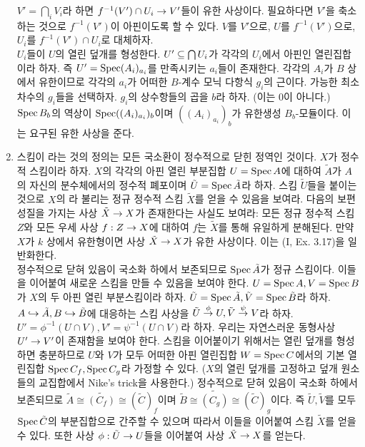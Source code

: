 \begin{enumerate}[label=\tb{3.\arabic*.},itemindent=0mm,itemsep=4mm]
	$V'=\bigcap_iV_i$라 하면 $f^{-1}(V')\cap U_i\rightarrow V'$들이 유한 사상이다.
	필요하다면 $V'$을 축소하는 것으로 $f^{-1}(V')$이 아핀이도록 할 수 있다.
	$V$를 $V'$으로, $U$를 $f^{-1}(V')$으로, $U_i$를 $f^{-1}(V')\cap U_i$로 대체하자.\\
	$U_i$들이 $U$의 열린 덮개를 형성한다. $U'\subseteq\bigcap U_i$가 각각의 $U_i$에서 아핀인 열린집합이라 하자.
	즉 $U'=\operatorname{Spec}(A_i)_{a_i}$를 만족시키는 $a_i$들이 존재한다.
	각각의 $A_i$가 $B$ 상에서 유한이므로 각각의 $a_i$가 어떠한 $B$-계수 모닉 다항식 $g_i$의 근이다.
	가능한 최소 차수의 $g_i$들을 선택하자. $g_i$의 상수항들의 곱을 $b$라 하자. (이는 0이 아니다.)
	$\operatorname{Spec} B_b$의 역상이 $\operatorname{Spec}((A_i)_{a_i})_b$이며 $((A_i)_{a_i})_b$가 유한생성 $B_b$-모듈이다. 이는 요구된 유한 사상을 준다.
	\item {} 스킴이 라는 것의 정의는 모든 국소환이 정수적으로 닫힌 정역인 것이다.
	$X$가 정수적 스킴이라 하자. $X$의 각각의 아핀 열린 부분집합 $U=\operatorname{Spec} A$에 대하여
	$\tilde A$가 $A$의 자신의 분수체에서의 정수적 폐포이며 $\tilde U=\operatorname{Spec}\tilde A$라 하자.
	스킴 $\tilde U$들을 붙이는 것으로 $X$의 라 불리는 정규 정수적 스킴 $\tilde X$를 얻을 수 있음을 보여라.
	다음의 보편 성질을 가지는 사상 $\tilde X\rightarrow X$가 존재한다는 사실도 보여라:
	모든 정규 정수적 스킴 $Z$와 모든 우세 사상 $f:Z\rightarrow X$에 대하여 $f$는 $\tilde X$를 통해 유일하게 분해된다.
	만약 $X$가 $k$ 상에서 유한형이면 사상 $\tilde X\rightarrow X$가 유한 사상이다. 이는 (I, Ex. 3.17)을 일반화한다.\\
	\sol 정수적으로 닫혀 있음이 국소화 하에서 보존되므로 $\operatorname{Spec}\tilde A$가 정규 스킴이다.
	이들을 이어붙여 새로운 스킴을 만들 수 있음을 보여야 한다.
	$U=\operatorname{Spec} A,V=\operatorname{Spec} B$가 $X$의 두 아핀 열린 부분스킴이라 하자.
	$\tilde U=\operatorname{Spec}\tilde A,\tilde V=\operatorname{Spec}\tilde B$라 하자.
	$A\hookrightarrow\tilde A,B\hookrightarrow\tilde B$에 대응하는 스킴 사상을 $\tilde U\stackrel{\phi}{\rightarrow} U,\tilde V\stackrel{\psi}{\rightarrow} V$라 하자.
	$U'=\phi^{-1}(U\cap V),V'=\psi^{-1}(U\cap V)$라 하자. 우리는 자연스러운 동형사상 $U'\rightarrow V'$이 존재함을 보여야 한다.
	스킴을 이어붙이기 위해서는 열린 덮개를 형성하면 충분하므로 $U$와 $V$가 모두 어떠한 아핀 열린집합 $W=\operatorname{Spec} C$에서의 기본 열린집합
	$\operatorname{Spec} C_f,\operatorname{Spec} C_g$라 가정할 수 있다. ($X$의 열린 덮개를 고정하고 덮개 원소들의 교집합에서 Nike's trick을 사용한다.)
	정수적으로 닫혀 있음이 국소화 하에서 보존되므로 $\tilde A\cong\tilde{(C_f)}\cong(\tilde C)_f$이며
	$\tilde B\cong\tilde{(C_g)}\cong(\tilde C)_g$이다. 즉 $\tilde U,\tilde V$를 모두
	$\operatorname{Spec}\tilde C$의 부분집합으로 간주할 수 있으며 따라서 이들을 이어붙여 스킴 $\tilde X$를 얻을 수 있다.
	또한 사상 $\phi:\tilde U\rightarrow U$들을 이어붙여 사상 $\tilde X\rightarrow X$를 얻는다.\\

\end{enumerate}
